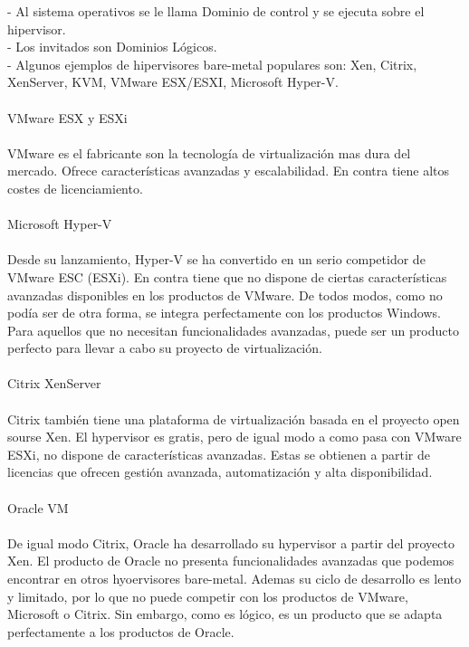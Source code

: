 \documentclass[12pt,letterpaper]{article}
\begin{document}
- Al sistema operativos  se le llama Dominio de control y se ejecuta sobre el hipervisor. \\
- Los invitados son Dominios Lógicos. \\
- Algunos ejemplos de hipervisores bare-metal populares son: Xen, Citrix, XenServer, KVM, VMware ESX/ESXI, Microsoft Hyper-V. \\ \\

VMware ESX y ESXi  \\ \\
VMware es el fabricante son la tecnología de virtualización mas dura del mercado. Ofrece características avanzadas y escalabilidad. En contra tiene altos costes de licenciamiento. \\ \\
Microsoft Hyper-V \\ \\
Desde su lanzamiento, Hyper-V se ha convertido en un serio competidor de VMware ESC (ESXi). En contra tiene que no dispone de ciertas características avanzadas disponibles en los productos de VMware. De todos modos, como no podía ser de otra forma, se integra perfectamente con los productos Windows. Para aquellos que no necesitan funcionalidades avanzadas, puede ser un producto perfecto para llevar a cabo su proyecto de virtualización. \\ \\
Citrix XenServer \\ \\
Citrix también tiene una plataforma de virtualización basada en el proyecto open sourse Xen. El hypervisor es gratis, pero de igual modo a como pasa con VMware ESXi, no dispone de características avanzadas. Estas se obtienen a partir de licencias que ofrecen gestión avanzada, automatización y alta disponibilidad. \\ \\

Oracle VM \\  \\
De igual modo Citrix, Oracle ha desarrollado su hypervisor a partir del proyecto Xen. El producto de Oracle no presenta funcionalidades avanzadas que podemos encontrar en otros hyoervisores bare-metal. Ademas su ciclo de desarrollo es lento y limitado, por lo que no puede competir con los productos de VMware, Microsoft o Citrix. Sin embargo, como es lógico, es un producto que se adapta perfectamente a los productos de Oracle. \\ \\
\end{document}
